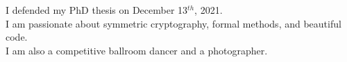 \vspace{0.5cm}
\begin{center}
	\setlength\tabcolsep{0pt}
	\setlength{\extrarowheight}{0pt}
	\small
	\color{darkgray}
	I defended my PhD thesis on December 13$^{th}$, 2021.\\
	I am passionate about symmetric cryptography, formal methods, and beautiful code.\\
	I am also a competitive ballroom dancer and a photographer.
\end{center}
